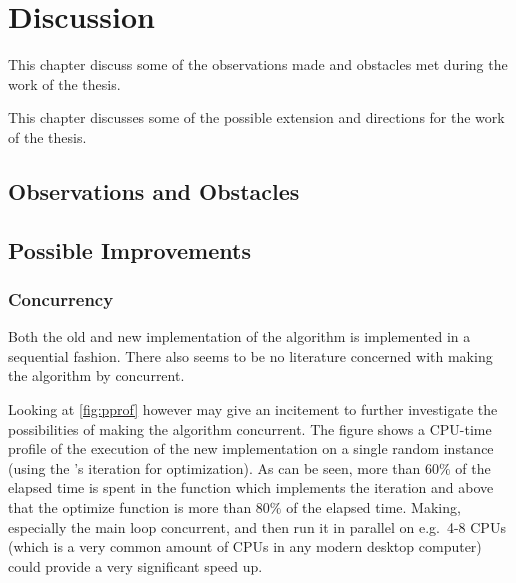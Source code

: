 {
\abnormalparskip{0pt}
\chapter{Discussion}
\label{cha:discussion}
}

This chapter discuss some of the observations made and obstacles met during the
work of the thesis.

This chapter discusses some of the possible extension and directions for the
work of the thesis. 


\section{Observations and Obstacles}
\label{sec:observ-obst}

\TODO[inline]{}

\section{Possible Improvements}
\label{sec:poss-impr}

\TODO[inline]{}

\subsection{Concurrency}
\label{sec:concurrency}

Both the old and new implementation of the algorithm is implemented in a
sequential fashion. There also seems to be no literature concerned with making
the algorithm by \citeauthor{smith1992} concurrent.

Looking at \cref{fig:pprof} however may give an incitement to further
investigate the possibilities of making the algorithm concurrent. The figure
shows a CPU-time profile of the execution of the new implementation on a single
random instance (using the \citeauthor{smith1992}'s iteration for optimization).
As can be seen, more than $60\%$ of the elapsed time is spent in the function
which implements the iteration and above that the optimize function is more than
$80\%$ of the elapsed time. Making, especially the main loop concurrent, and
then run it in parallel on e.g.\ 4-8 CPUs (which is a very common amount of
CPUs in any modern desktop computer) could provide a very significant speed up.

